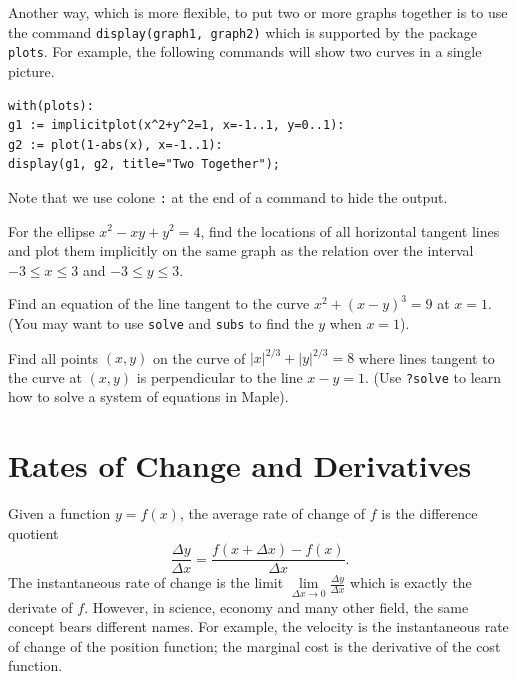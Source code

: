 \documentclass[]{book}
\theoremstyle{definition}
\theoremstyle{definition}
\theoremstyle{definition}
\theoremstyle{remark}
\let\BeginKnitrBlock\begin \let\EndKnitrBlock\end
\begin{document}
\BeginKnitrBlock{remark}
{}
Another way, which is more flexible, to put two or more graphs together is to use the command \texttt{display(graph1,\ graph2)} which is supported by the package \texttt{plots}. For example, the following commands will show two curves in a single picture.

\begin{verbatim}
with(plots):
g1 := implicitplot(x^2+y^2=1, x=-1..1, y=0..1):
g2 := plot(1-abs(x), x=-1..1):
display(g1, g2, title="Two Together");
\end{verbatim}

Note that we use colone \texttt{:} at the end of a command to hide the output.
\EndKnitrBlock{remark}

\BeginKnitrBlock{exercise}
\protect\hypertarget{exr:unnamed-chunk-68}{}{\label{exr:unnamed-chunk-68} }
For the ellipse \(x^2-xy+y^2=4\), find the locations of all horizontal tangent lines and plot them implicitly on the same graph as the relation over the interval \(-3 \leq x \leq 3\) and \(-3 \leq y \leq 3\).
\EndKnitrBlock{exercise}

\BeginKnitrBlock{exercise}
\protect\hypertarget{exr:unnamed-chunk-69}{}{\label{exr:unnamed-chunk-69} }
Find an equation of the line tangent to the curve \(x^2 + (x-y)^3 = 9\) at \(x=1\). (You may want to use \texttt{solve} and \texttt{subs} to find the \(y\) when \(x=1\)).
\EndKnitrBlock{exercise}

\BeginKnitrBlock{exercise}
\protect\hypertarget{exr:unnamed-chunk-70}{}{\label{exr:unnamed-chunk-70} }
Find all points \((x, y)\) on the curve of \(|x|^{2/3} + |y|^{2/3} = 8\) where lines tangent to the curve at \((x, y)\) is perpendicular to the line \(x-y=1\). (Use \texttt{?solve} to learn how to solve a system of equations in Maple).
\EndKnitrBlock{exercise}

\hypertarget{rates-of-change-and-derivatives}{%
\section{Rates of Change and Derivatives}\label{rates-of-change-and-derivatives}}

Given a function \(y=f(x)\), the average rate of change of \(f\) is the difference quotient
\[
\frac{\Delta y}{\Delta x}=\frac{f(x+\Delta x)-f(x)}{\Delta x}.
\]
The instantaneous rate of change is the limit \(\lim\limits_{\Delta x\to 0}\frac{\Delta y}{\Delta x}\) which is exactly the derivate of \(f\). However, in science, economy and many other field, the same concept bears different names. For example, the velocity is the instantaneous rate of change of the position function; the marginal cost is the derivative of the cost function.
\end{document}
